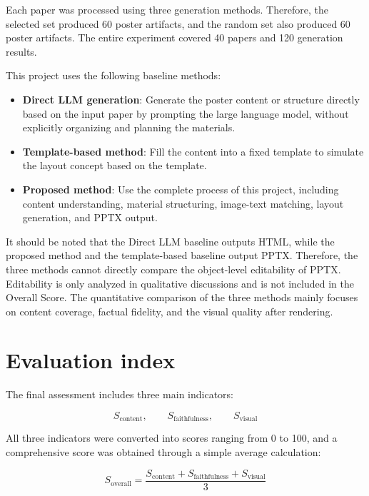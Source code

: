 \documentclass[12pt,oneside]{report}
\begin{document}
\vspace{1em}

Each paper was processed using three generation methods. Therefore, the selected set produced 60 poster artifacts, and the random set also produced 60 poster artifacts. The entire experiment covered 40 papers and 120 generation results.

\vspace{1em}

This project uses the following baseline methods:

\begin{itemize}
\item \textbf{Direct LLM generation}: Generate the poster content or structure directly based on the input paper by prompting the large language model, without explicitly organizing and planning the materials.
\item \textbf{Template-based method}: Fill the content into a fixed template to simulate the layout concept based on the template.
\item \textbf{Proposed method}: Use the complete process of this project, including content understanding, material structuring, image-text matching, layout generation, and PPTX output. \end{itemize}

It should be noted that the Direct LLM baseline outputs HTML, while the proposed method and the template-based baseline output PPTX. Therefore, the three methods cannot directly compare the object-level editability of PPTX. Editability is only analyzed in qualitative discussions and is not included in the Overall Score. The quantitative comparison of the three methods mainly focuses on content coverage, factual fidelity, and the visual quality after rendering.

\section{Evaluation index}

The final assessment includes three main indicators:

\[
S_{\mathrm{content}},
\qquad
S_{\mathrm{faithfulness}},
\qquad
S_{\mathrm{visual}}
\]

All three indicators were converted into scores ranging from 0 to 100, and a comprehensive score was obtained through a simple average calculation:

\[
S_{\mathrm{overall}}
=
\frac{
S_{\mathrm{content}}
+
S_{\mathrm{faithfulness}}
+
S_{\mathrm{visual}}
}{3}
\]
\end{document}
